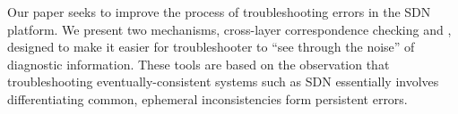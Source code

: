 Our paper seeks to improve the process of troubleshooting errors in the SDN
platform. We present two mechanisms, cross-layer correspondence checking
and \simulator, 
designed to make it easier for troubleshooter to ``see through the noise'' of
diagnostic information. These tools are based on the observation that 
troubleshooting eventually-consistent systems such as SDN essentially
involves differentiating common, ephemeral inconsistencies form persistent
errors. 

